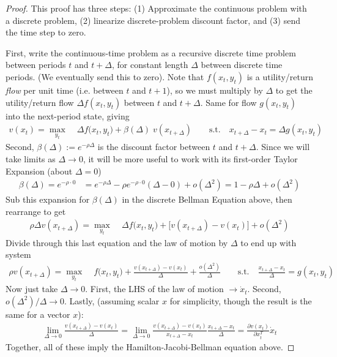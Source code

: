 \documentclass[12pt]{book}
\numberwithin{equation}{section} %
\theoremstyle{plain}
\theoremstyle{definition}
\theoremstyle{remark}
\newcommand{\ra}{\rightarrow}
\begin{document}
\begin{proof}
This proof has three steps: (1) Approximate the continuous problem with
a discrete problem, (2) linearize discrete-problem discount factor,
and (3) send the time step to zero.

First, write the continuous-time problem as a recursive discrete time
problem between periods $t$ and $t+\Delta$, for constant length $\Delta$
between discrete time periods. (We eventually send this to zero).
Note that $f(x_t,y_t)$ is a utility/return \emph{flow} per unit time
(i.e.  between $t$ and $t+1$), so we must multiply by $\Delta$
to get the utility/return flow $\Delta f(x_t,y_t)$ between $t$ and
$t+\Delta$.
Same for flow $g(x_t,y_t)$ into the next-period state, giving
\begin{align*}
  v(x_t) = \max_{y_t}\;
  &\Delta f(x_t,y_t\big)
  + \beta(\Delta)\;v(x_{t+\Delta})
  \qquad
  \text{s.t.}\quad
  x_{t+\Delta}-x_t = \Delta g(x_t,y_t)
\end{align*}
Second, $\beta(\Delta):=e^{-\rho \Delta}$ is the discount factor between
$t$ and $t+\Delta$. Since we will take limits as $\Delta\ra 0$, it will
be more useful to work with its first-order Taylor Expansion (about
$\Delta=0$)
\begin{align*}
  \beta(\Delta)
  = e^{-\rho \cdot 0}
  &=
  e^{-\rho\Delta}
  -\rho e^{-\rho \cdot 0}
  (\Delta-0)
  + o(\Delta^2)
  =
  1-\rho\Delta + o(\Delta^2)
\end{align*}
Sub this expansion for $\beta(\Delta)$ in the discrete Bellman Equation
above, then rearrange to get
\begin{align*}
  \rho\Delta v(x_{t+\Delta})
  = \max_{y_t}\;
  &\Delta f(x_t,y_t\big)
  +
  \big[
  v(x_{t+\Delta}) - v(x_t)
  \big]
  + o(\Delta^2)
\end{align*}
Divide through this last equation and the law of motion by $\Delta$ to
end up with system
\begin{align*}
  \rho v(x_{t+\Delta})
  = \max_{y_t}\;
  & f(x_t,y_t\big)
  +
  \frac{v(x_{t+\Delta}) - v(x_t)}{\Delta}
  + \frac{o(\Delta^2)}{\Delta}
  \qquad
  \text{s.t.}\quad
   \frac{x_{t+\Delta}-x_t}{\Delta} = g(x_t,y_t)
\end{align*}
Now just take $\Delta\ra 0$.
First, the LHS of the law of motion $\ra \dot{x}_t$.
Second, $o(\Delta^2)/\Delta \ra 0$.
Lastly, (assuming scalar $x$ for simplicity, though the result is the
same for a vector $x$):
\begin{align*}
  \lim_{\Delta\ra 0}
  \frac{v(x_{t+\Delta}) - v(x_t)}{\Delta}
  =
  \lim_{\Delta\ra 0}
  \frac{v(x_{t+\Delta}) - v(x_t)}{x_{t+\Delta}-x_t}
  \frac{x_{t+\Delta}-x_t}{\Delta}
  = \frac{\partial v(x_t)}{\partial x_t^T}\dot{x}_t
\end{align*}
Together, all of these imply the Hamilton-Jacobi-Bellman equation above.
\end{proof}
\end{document}
